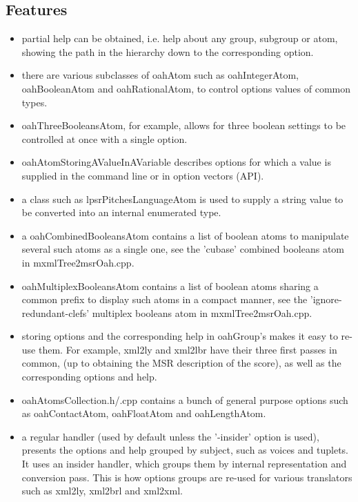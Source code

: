 \subsection{Features}

\begin{itemize}
\item partial help can be obtained, i.e. help about any group, subgroup or atom,
    showing the path in the hierarchy down to the corresponding option.

\item there are various subclasses of oahAtom such as oahIntegerAtom, oahBooleanAtom
    and oahRationalAtom, to control options values of common types.

\item oahThreeBooleansAtom, for example, allows for three boolean settings
    to be controlled at once with a single option.

\item oahAtomStoringAValueInAVariable describes options for which a value is supplied
    in the command line or in option vectors (API).

\item a class such as lpsrPitchesLanguageAtom is used
    to supply a string value to be converted into an internal enumerated type.

\item a oahCombinedBooleansAtom contains a list of boolean atoms
    to manipulate several such atoms as a single one,
    see the 'cubase' combined booleans atom in mxmlTree2msrOah.cpp.

\item oahMultiplexBooleansAtom contains a list of boolean atoms
    sharing a common prefix to display such atoms in a compact manner,
    see the 'ignore-redundant-clefs' multiplex booleans atom in mxmlTree2msrOah.cpp.

\item storing options and the corresponding help in oahGroup's makes it easy to re-use them.
    For example, xml2ly and xml2lbr have their three first passes in common,
    (up to obtaining the MSR description of the score),
    as well as the corresponding options and help.

\item oahAtomsCollection.h/.cpp contains a bunch of general purpose options
    such as oahContactAtom, oahFloatAtom and oahLengthAtom.

\item a regular handler (used by default unless the '-insider' option is used),
    presents the options and help grouped by subject, such as voices and tuplets.
    It uses an insider handler, which groups them by internal representation
    and conversion pass.
    This is how options groups are re-used for various
    translators such as xml2ly, xml2brl and xml2xml.

\end{itemize}


